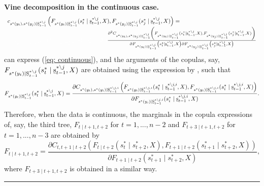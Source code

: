 \documentclass[harvard,11pt]{article}
\newenvironment{proof}[1][Proof]{\textbf{#1.} }{\  \rule{0.5em}{0.5em}}
\begin{document}
\begin{proof}[Vine decomposition in the continuous case]
\begin{align}
\begin{split}
\begin{array}{l}
c_{s^*(y_t),s^*(y_j)\mid \text{\b{S}}_{t-1}^{*\backslash j}}\left(F_{s^*(y_t)\mid\text{\b{S}}_{t-1}^{*\backslash j}}(s_t^*\mid \text{\b{s}}_{t-1}^{*\backslash j},X),F_{s^*(y_j)\mid\text{\b{S}}_{t-1}^{*\backslash j}}(s_j^*\mid \text{\b{s}}_{t-1}^{*\backslash j},X) \right)=\\
\textcolor{white}{c_{s^*(y_t),s^*(y_j)\mid \text{\b{S}}_{t-1}^{*\backslash j}}(F_{s^*(y_t)\mid\text{\b{S}}_{t-1}^{*\backslash j}}(s_t^*\mid \text{\b{s}}_{t-1}^{*\backslash j},X)}\frac{\partial^2C_{s^*(y_t),s^*(y_j)\mid \text{\b{S}}_{t-1}^{*\backslash j}}\left(F_{s^*(y_t)\mid\text{\b{S}}_{t-1}^{*\backslash j}}(s_t^*\mid \text{\b{s}}_{t-1}^{*\backslash j},X),F_{s^*(y_j)\mid\text{\b{S}}_{t-1}^{*\backslash j}}(s_j^*\mid \text{\b{s}}_{t-1}^{*\backslash j},X) \right)}{\partial F_{s^*(y_t)\mid\text{\b{S}}_{t-1}^{*\backslash j}}\left(s_t^*\mid \text{\b{s}}_{t-1}^{*\backslash j},X\right)\partial F_{s^*(y_j)\mid\text{\b{S}}_{t-1}^{*\backslash j}}\left(s_j^*\mid \text{\b{s}}_{t-1}^{*\backslash j},X\right)}
\end{array}
\end{split}
\end{align}
\endgroup
 can express (\ref{eq: continuous}), and the arguments of the copulas, say, $F_{s^*(y_t)\mid\text{\b{S}}_{t-1}^{*\backslash j}}(s_t^*\mid \text{\b{s}}_{t-1}^{*\backslash j},X)$ are obtained using the expression by \citet{joe1996families}, such that
\begin{equation}
F_{s^*(y_t)\mid\text{\b{S}}_{t-1}^{*\backslash j}}(s_t^*\mid \text{\b{s}}_{t-1}^{*\backslash j},X)=\frac{\partial C_{s^*(y_t),s^*(y_i)\mid \text{\b{S}}_{t-1}^{*\backslash j,i}}\left(F_{s^*(y_t)\mid\text{\b{S}}_{t-1}^{*\backslash j,i}}(s_t^*\mid \text{\b{s}}_{t-1}^{*\backslash j,i},X),F_{s^*(y_i)\mid\text{\b{S}}_{t-1}^{*\backslash j,i}}(s_i^*\mid \text{\b{s}}_{t-1}^{*\backslash j,i},X)\right)}{\partial F_{s^*(y_i)\mid\text{\b{S}}_{t-1}^{*\backslash j,i}}(s_i^*\mid \text{\b{s}}_{t-1}^{*\backslash j,i},X)}.
\end{equation}
Therefore, when the data is continuous, the marginals in the copula expressions of, say, the third tree, $F_{t\mid t+1,t+2}$ for $t=1,...,n-2$ and $F_{t+3\mid t+1,t+2}$ for $t=1,...,n-3$ are obtained by 
\begin{equation}
F_{t\mid t+1,t+2}=\frac{\partial C_{t,t+1\mid t+2}(F_{t\mid t+2}(s_t^*\mid s_{t+2}^*,X),F_{t+1\mid t+2}(s_{t+1}^*\mid s_{t+2}^*,X))}{\partial F_{t+1\mid t+2}(s_{t+1}^*\mid s_{t+2}^*,X)},
\end{equation}
where $F_{t+3\mid t+1,t+2}$ is obtained in a similar way.
\end{proof}
\end{document}
